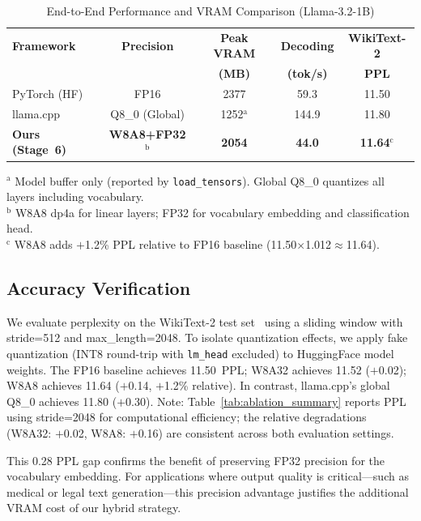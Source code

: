 \documentclass[conference]{IEEEtran}
\begin{document}
\begin{table}[htbp]
\centering
\caption{End-to-End Performance and VRAM Comparison (Llama-3.2-1B)}
\label{tab:end_to_end}
\setlength{\tabcolsep}{3pt}
\begin{tabular}{lcccc}
\toprule
\textbf{Framework} & \textbf{Precision} & \textbf{Peak VRAM} & \textbf{Decoding} & \textbf{WikiText-2} \\
 & & \textbf{(MB)} & \textbf{(tok/s)} & \textbf{PPL} \\
\midrule
PyTorch (HF) & FP16 & 2377 & 59.3 & 11.50 \\
llama.cpp & Q8\_0 (Global) & 1252$^{\mathrm{a}}$ & 144.9 & 11.80 \\
\midrule
\textbf{Ours (Stage~6)} & \textbf{W8A8+FP32$^{\mathrm{b}}$} & \textbf{2054} & \textbf{44.0} & \textbf{11.64$^{\mathrm{c}}$} \\
\bottomrule
\end{tabular}

\vspace{3pt}
\raggedright
\scriptsize $^{\mathrm{a}}$ Model buffer only (reported by \texttt{load\_tensors}). Global Q8\_0 quantizes all layers including vocabulary. \\
\scriptsize $^{\mathrm{b}}$ W8A8 dp4a for linear layers; FP32 for vocabulary embedding and classification head. \\
\scriptsize $^{\mathrm{c}}$ W8A8 adds $+$1.2\% PPL relative to FP16 baseline (11.50$\times$1.012$\approx$11.64).
\end{table}

\subsection{Accuracy Verification}
\label{sec:accuracy}
We evaluate perplexity on the WikiText-2 test set~\cite{merity2016wikitext} using a sliding window with stride=512 and max\_length=2048. To isolate quantization effects, we apply fake quantization (INT8 round-trip with \texttt{lm\_head} excluded) to HuggingFace model weights. The FP16 baseline achieves 11.50~PPL; W8A32 achieves 11.52 ($+$0.02); W8A8 achieves 11.64 ($+$0.14, $+$1.2\% relative). In contrast, llama.cpp's global Q8\_0 achieves 11.80 ($+$0.30). Note: Table~\ref{tab:ablation_summary} reports PPL using stride=2048 for computational efficiency; the relative degradations (W8A32: $+$0.02, W8A8: $+$0.16) are consistent across both evaluation settings.

This 0.28 PPL gap confirms the benefit of preserving FP32 precision for the vocabulary embedding. For applications where output quality is critical---such as medical or legal text generation---this precision advantage justifies the additional VRAM cost of our hybrid strategy.
\end{document}
